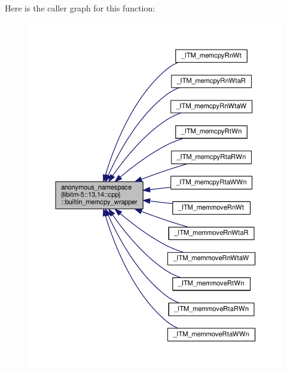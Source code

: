 Here is the caller graph for this function\-:
\nopagebreak
\begin{figure}[H]
\begin{center}
\leavevmode
\includegraphics[width=350pt]{namespaceanonymous__namespace_02libitm-5_813_0014_8cpp_03_a8dd7dae76248648e1534f566e0af169b_icgraph}
\end{center}
\end{figure}


